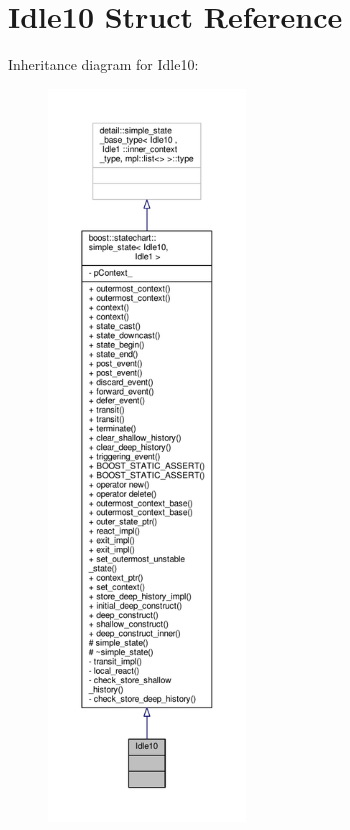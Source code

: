 \hypertarget{struct_idle10}{}\section{Idle10 Struct Reference}
\label{struct_idle10}


Inheritance diagram for Idle10\+:
\nopagebreak
\begin{figure}[H]
\begin{center}
\leavevmode
\includegraphics[height=550pt]{struct_idle10__inherit__graph}
\end{center}
\end{figure}


